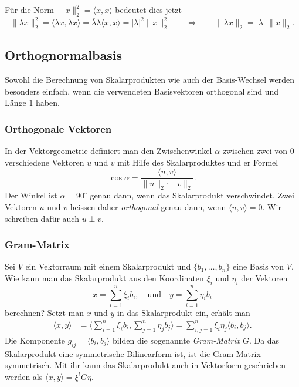 Für die Norm $\|x\|_2^2=\langle x,x\rangle$ bedeutet dies jetzt
\[
\|\lambda x\|_2^2
=
\langle \lambda x,\lambda x\rangle
=
\overline{\lambda}\lambda \langle x,x\rangle
=
|\lambda|^2 \|x\|_2^2
\qquad\Rightarrow\qquad
\|\lambda x\|_2 = |\lambda|\, \|x\|_2.
\]

\subsection{Orthognormalbasis
\label{buch:subsection:orthonormalbasis}}
%
Sowohl die Berechnung von Skalarprodukten wie auch der Basis-Wechsel
werden besonders einfach, wenn die verwendeten Basisvektoren orthogonal
sind und Länge $1$ haben.

\subsubsection{Orthogonale Vektoren}
In der Vektorgeometrie definiert man den Zwischenwinkel $\alpha$
zwischen zwei von $0$ verschiedene Vektoren $u$ und $v$ mit Hilfe
des Skalarproduktes und er Formel
\[
\cos\alpha = \frac{\langle u,v\rangle}{\|u\|_2\cdot\|v\|_2}.
\]
Der Winkel ist $\alpha=90^\circ$ genau dann, wenn das Skalarprodukt
verschwindet.
Zwei Vektoren $u$ und $v$ heissen daher {\em orthogonal} genau dann,
wenn $\langle u,v\rangle=0$.
Wir schreiben dafür auch $u\perp v$.
%

\subsubsection{Gram-Matrix}
Sei $V$ ein Vektorraum mit einem Skalarprodukt und $\{b_1,\dots,b_n\}$ eine
Basis von $V$.
Wie kann man das Skalarprodukt aus den Koordinaten $\xi_i$ und $\eta_i$
der Vektoren 
\[
x = \sum_{i=1}^n \xi_i b_i,
\quad\text{und}\quad
y = \sum_{i=1}^n \eta_i b_i
\]
berechnen?
Setzt man $x$ und $y$ in das Skalarprodukt ein, erhält man
\begin{align}
\langle x,y\rangle
&=
\biggl\langle
\sum_{i=1}^n \xi_i b_i,
\sum_{j=1}^n \eta_j b_j
\biggr\rangle
=
\sum_{i,j=1}^n \xi_i\eta_j \langle b_i,b_j\rangle.
\label{buch:skalarprodukt:eqn:skalarproduktgram}
\end{align}
Die Komponente $g_{i\!j}=\langle b_i,b_j\rangle$ bilden die sogenannte
{\em Gram-Matrix} $G$.
%
Da das Skalarprodukt eine symmetrische Bilinearform ist, ist die
Gram-Matrix symmetrisch.
Mit ihr kann das Skalarprodukt auch in Vektorform geschrieben werden
als $\langle x,y\rangle = \xi^t G\eta$.

